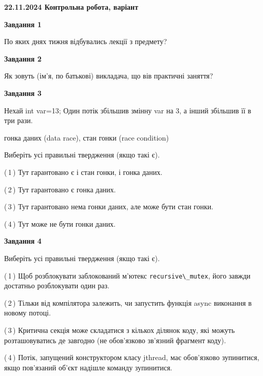 \documentclass[12pt, ukrainian]{article}
\def\code#1{\Verb!#1!}
\begin{document}
\begin {large}

\textbf{22.11.2024 Контрольна робота, варіант  }\par


{

\begin{center}
\textbf{Завдання 1}
\end{center}

По яких днях тижня відбувались лекції з предмету?


\begin{center}
\textbf{Завдання 2}
\end{center}

Як зовуть (ім'я, по батькові) викладача, що вів практичні заняття?


\begin{center}
\textbf{Завдання 3}
\end{center}

Нехай int var=13; Один потік збільшив змінну var на 3, а інший збільшив її в три рази.

гонка даних (data race), стан гонки (race condition)

Виберіть усі правильні твердження (якщо такі є).\par
\vspace{2mm}
(\,1\,) Тут гарантовано є і стан гонки, і гонка даних.%

(\,2\,) Тут гарантовано є гонка даних.%

(\,3\,) Тут гарантовано нема гонки даних, але може бути стан гонки.%

(\,4\,) Тут може не бути гонки даних.%


\begin{center}
\textbf{Завдання 4}
\end{center}

Виберіть усі правильні твердження (якщо такі є).\par
\vspace{2mm}

(\,1\,) Щоб розблокувати заблокований м’ютекс \code{recursive\_mutex}, його завжди достатньо розблокувати один раз.%

(\,2\,) Тільки від компілятора залежить, чи запустить функція async виконання в новому потоці.%

(\,3\,) Критична секція може складатися з кількох ділянок коду, які можуть розташовуватись де завгодно (не обов’язково зв’язний фрагмент коду).%

(\,4\,) Потік, запущений конструктором класу jthread, має обов’язково зупинитися, якщо пов’язаний об’єкт надішле команду зупинитися.%


}
\end{large}
\end{document}
